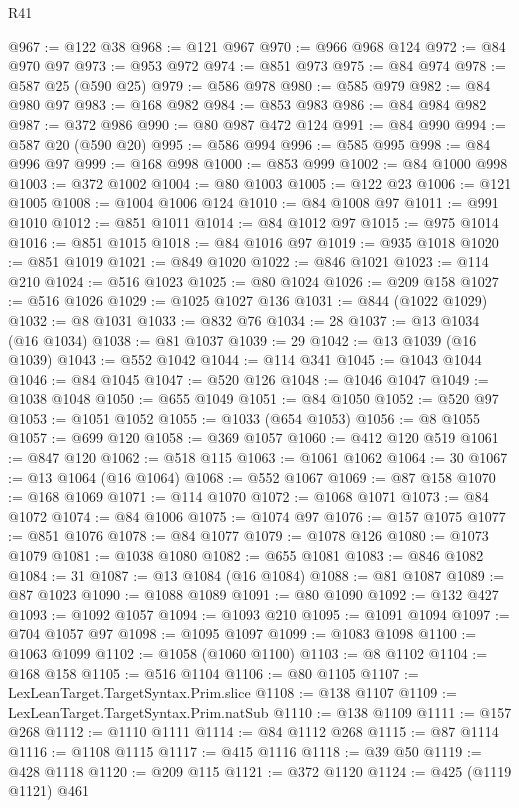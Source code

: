 \begin{lexlean}{R41}
\begin{coremodule}
@967 := @122 @38
@968 := @121 @967
@970 := @966 @968 @124
@972 := @84 @970 @97
@973 := @953 @972
@974 := @851 @973
@975 := @84 @974
@978 := @587 @25 (@590 @25)
@979 := @586 @978
@980 := @585 @979
@982 := @84 @980 @97
@983 := @168 @982
@984 := @853 @983
@986 := @84 @984 @982
@987 := @372 @986
@990 := @80 @987 @472 @124
@991 := @84 @990
@994 := @587 @20 (@590 @20)
@995 := @586 @994
@996 := @585 @995
@998 := @84 @996 @97
@999 := @168 @998
@1000 := @853 @999
@1002 := @84 @1000 @998
@1003 := @372 @1002
@1004 := @80 @1003
@1005 := @122 @23
@1006 := @121 @1005
@1008 := @1004 @1006 @124
@1010 := @84 @1008 @97
@1011 := @991 @1010
@1012 := @851 @1011
@1014 := @84 @1012 @97
@1015 := @975 @1014
@1016 := @851 @1015
@1018 := @84 @1016 @97
@1019 := @935 @1018
@1020 := @851 @1019
@1021 := @849 @1020
@1022 := @846 @1021
@1023 := @114 @210
@1024 := @516 @1023
@1025 := @80 @1024
@1026 := @209 @158
@1027 := @516 @1026
@1029 := @1025 @1027 @136
@1031 := @844 (@1022 @1029)
@1032 := @8 @1031
@1033 := @832 @76
@1034 := 28
@1037 := @13 @1034 (@16 @1034)
@1038 := @81 @1037
@1039 := 29
@1042 := @13 @1039 (@16 @1039)
@1043 := @552 @1042
@1044 := @114 @341
@1045 := @1043 @1044
@1046 := @84 @1045
@1047 := @520 @126
@1048 := @1046 @1047
@1049 := @1038 @1048
@1050 := @655 @1049
@1051 := @84 @1050
@1052 := @520 @97
@1053 := @1051 @1052
@1055 := @1033 (@654 @1053)
@1056 := @8 @1055
@1057 := @699 @120
@1058 := @369 @1057
@1060 := @412 @120 @519
@1061 := @847 @120
@1062 := @518 @115
@1063 := @1061 @1062
@1064 := 30
@1067 := @13 @1064 (@16 @1064)
@1068 := @552 @1067
@1069 := @87 @158
@1070 := @168 @1069
@1071 := @114 @1070
@1072 := @1068 @1071
@1073 := @84 @1072
@1074 := @84 @1006
@1075 := @1074 @97
@1076 := @157 @1075
@1077 := @851 @1076
@1078 := @84 @1077
@1079 := @1078 @126
@1080 := @1073 @1079
@1081 := @1038 @1080
@1082 := @655 @1081
@1083 := @846 @1082
@1084 := 31
@1087 := @13 @1084 (@16 @1084)
@1088 := @81 @1087
@1089 := @87 @1023
@1090 := @1088 @1089
@1091 := @80 @1090
@1092 := @132 @427
@1093 := @1092 @1057
@1094 := @1093 @210
@1095 := @1091 @1094
@1097 := @704 @1057 @97
@1098 := @1095 @1097
@1099 := @1083 @1098
@1100 := @1063 @1099
@1102 := @1058 (@1060 @1100)
@1103 := @8 @1102
@1104 := @168 @158
@1105 := @516 @1104
@1106 := @80 @1105
@1107 := LexLeanTarget.TargetSyntax.Prim.slice
@1108 := @138 @1107
@1109 := LexLeanTarget.TargetSyntax.Prim.natSub
@1110 := @138 @1109
@1111 := @157 @268
@1112 := @1110 @1111
@1114 := @84 @1112 @268
@1115 := @87 @1114
@1116 := @1108 @1115
@1117 := @415 @1116
@1118 := @39 @50
@1119 := @428 @1118
@1120 := @209 @115
@1121 := @372 @1120
@1124 := @425 (@1119 @1121) @461

\end{coremodule}
\end{lexlean}
